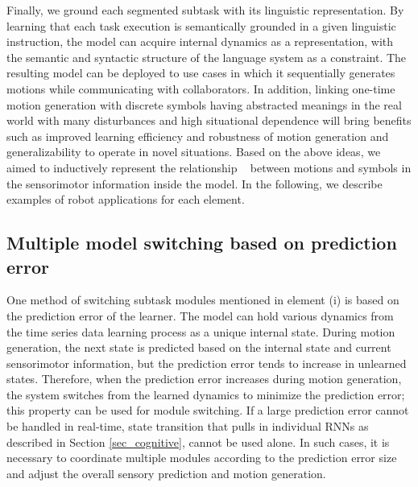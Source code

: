 Finally, we ground each segmented subtask with its linguistic representation. By learning that each task execution is semantically grounded in a given linguistic instruction, the model can acquire internal dynamics as a representation, with the semantic and syntactic structure of the language system as a constraint. The resulting model can be deployed to use cases in which it sequentially generates motions while communicating with collaborators. In addition, linking one-time motion generation with discrete symbols having abstracted meanings in the real world with many disturbances and high situational dependence will bring benefits such as improved learning efficiency and robustness of motion generation and generalizability to operate in novel situations. Based on the above ideas, we aimed to inductively represent the relationship ~\cite{Harned1990pd} between motions and symbols in the sensorimotor information inside the model. In the following, we describe examples of robot applications for each element.



\subsection{Multiple model switching based on prediction error}
One method of switching subtask modules mentioned in element (i) is based on the prediction error of the learner. The model can hold various dynamics from the time series data learning process as a unique internal state. During motion generation, the next state is predicted based on the internal state and current sensorimotor information, but the prediction error tends to increase in unlearned states. Therefore, when the prediction error increases during motion generation, the system switches from the learned dynamics to minimize the prediction error; this property can be used for module switching. If a large prediction error cannot be handled in real-time, state transition that pulls in individual RNNs as described in Section \ref{sec_cognitive}, cannot be used alone. In such cases, it is necessary to coordinate multiple modules according to the prediction error size and adjust the overall sensory prediction and motion generation.

